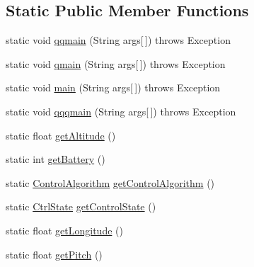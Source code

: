 \subsection*{Static Public Member Functions}
\begin{DoxyCompactItemize}
\item 
static void \hyperlink{classworkspace_1_1_a_r_drone_nav_data_1_1src_1_1controller_1_1_drone_test_aacfb6bd5e568edda30acc14eee20427e}{qqmain} (String args\mbox{[}$\,$\mbox{]})  throws Exception 	
\item 
static void \hyperlink{classworkspace_1_1_a_r_drone_nav_data_1_1src_1_1controller_1_1_drone_test_a74f153af7bd0475847ef2678a903cf33}{qmain} (String args\mbox{[}$\,$\mbox{]})  throws Exception     
\item 
static void \hyperlink{classworkspace_1_1_a_r_drone_nav_data_1_1src_1_1controller_1_1_drone_test_a9d8d7331058c68ecb0a51ae97cf73e1a}{main} (String args\mbox{[}$\,$\mbox{]})  throws Exception 	
\item 
static void \hyperlink{classworkspace_1_1_a_r_drone_nav_data_1_1src_1_1controller_1_1_drone_test_a05df95773f5e0f9870022810594be635}{qqqmain} (String args\mbox{[}$\,$\mbox{]})  throws Exception 	
\item 
static float \hyperlink{classworkspace_1_1_a_r_drone_nav_data_1_1src_1_1controller_1_1_drone_test_a4519d9b0a60e429bcadc687122988d09}{get\+Altitude} ()
\item 
static int \hyperlink{classworkspace_1_1_a_r_drone_nav_data_1_1src_1_1controller_1_1_drone_test_a280e06947efa730b99c08edc09b5fa0e}{get\+Battery} ()
\item 
static \hyperlink{enumworkspace_1_1_a_r_drone_nav_data_1_1src_1_1controller_1_1_control_algorithm}{Control\+Algorithm} \hyperlink{classworkspace_1_1_a_r_drone_nav_data_1_1src_1_1controller_1_1_drone_test_a407a69e8bedde4ed052505af97a2684c}{get\+Control\+Algorithm} ()
\item 
static \hyperlink{enumworkspace_1_1_a_r_drone_nav_data_1_1src_1_1controller_1_1_ctrl_state}{Ctrl\+State} \hyperlink{classworkspace_1_1_a_r_drone_nav_data_1_1src_1_1controller_1_1_drone_test_ac4214cfa865af817327f7661f915f479}{get\+Control\+State} ()
\item 
static float \hyperlink{classworkspace_1_1_a_r_drone_nav_data_1_1src_1_1controller_1_1_drone_test_a77f7e68d648359d25dfda91cec2c7258}{get\+Longitude} ()
\item 
static float \hyperlink{classworkspace_1_1_a_r_drone_nav_data_1_1src_1_1controller_1_1_drone_test_a1bb00c14f9e9376c3964b6d2cdbc8cbd}{get\+Pitch} ()

\end{DoxyCompactItemize}

